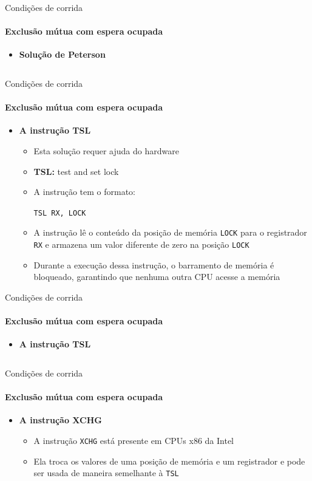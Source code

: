 \documentclass{beamer}
\begin{document}
\begin{frame}{Condições de corrida}
	\framesubtitle{Exclusão mútua com espera ocupada}
	\begin{itemize}
		\item \textbf{Solução de Peterson}
		\inputminted[fontsize=\footnotesize]{c}{resources/peterson.c}
	\end{itemize}
\end{frame}
\begin{frame}{Condições de corrida}
	\framesubtitle{Exclusão mútua com espera ocupada}
	\begin{itemize}
		\item \textbf{A instrução TSL}
		\begin{itemize}
			\item Esta solução requer ajuda do hardware
			\item \textbf{TSL:} test and set lock
			\item A instrução tem o formato:
			
			\texttt{TSL RX, LOCK}
			\item A instrução lê o conteúdo da posição de memória \texttt{LOCK} para o registrador \texttt{RX} e armazena um valor diferente de zero na posição \texttt{LOCK}
			\item Durante a execução dessa instrução, o barramento de memória é bloqueado, garantindo que nenhuma outra CPU acesse a memória
		\end{itemize}
	\end{itemize}
\end{frame}
\begin{frame}{Condições de corrida}
	\framesubtitle{Exclusão mútua com espera ocupada}
	\begin{itemize}
		\item \textbf{A instrução TSL}
		\inputminted{c}{resources/tsl.asm}
	\end{itemize}
\end{frame}
\begin{frame}{Condições de corrida}
	\framesubtitle{Exclusão mútua com espera ocupada}
	\begin{itemize}
		\item \textbf{A instrução XCHG}
		\begin{itemize}
			\item A instrução \texttt{XCHG} está presente em CPUs x86 da Intel
			\item Ela troca os valores de uma posição de memória e um registrador e pode ser usada de maneira semelhante à \texttt{TSL}
		\end{itemize}
	\end{itemize}
\end{frame}
\end{document}

